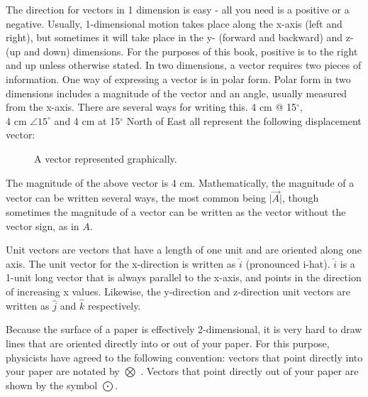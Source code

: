 The direction for vectors in 1 dimension is easy - all you need is a positive or a negative.  Usually, 1-dimensional motion takes place along the x-axis (left and right), but sometimes it will take place in the y- (forward and backward) and z- (up and down) dimensions.  For the purposes of this book, positive is to the right and up unless otherwise stated. 
In two dimensions, a vector requires two pieces of information.  One way of expressing a vector is in polar form.  Polar form in two dimensions includes a magnitude of the vector and an angle, usually measured from the x-axis.  There are several ways for writing this.  4 cm @ 15$^\circ$, \\ 4 cm $\angle 15^\circ$ and 4 cm at 15$^\circ$ North of East all represent the following displacement vector:



\begin{figure}[h]
	\caption{A vector represented graphically.} \label{figure:M1}
	\centering
	
\end{figure}


	
	
	



	
	The magnitude of the above vector is 4 cm.  Mathematically, the magnitude of a vector can be written several ways, the most common being $\lvert \vec{A} \rvert$, though sometimes the magnitude of a vector can be written as the vector without the vector sign, as in $A$. 
	
	Unit vectors are vectors that have a length of one unit and are oriented along one axis.  The unit vector for the x-direction is written as $\hat{i}$ (pronounced i-hat).  $\hat{i}$ is a 1-unit long vector that is always parallel to the x-axis, and points in the direction of increasing x values.  Likewise, the y-direction and z-direction unit vectors are written as $\hat{j}$ and $\hat{k}$ respectively.  
	
	
	Because the surface of a paper is effectively 2-dimensional, it is very hard to draw lines that are oriented directly into or out of your paper. For this purpose, physicists have agreed to the following convention: vectors that point directly into your paper are notated by $\bigotimes$ .  Vectors that point directly out of your paper are shown by the symbol $\bigodot$.  
	
